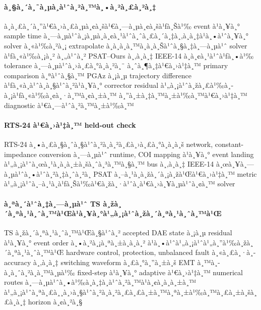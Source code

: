 ﻿\documentclass[12pt,a4paper]{article}
\begin{document}
\paragraph{à¸§à¸´à¸˜à¸µà¸­à¹ˆà¸²à¸™à¸•à¸²à¸£à¸²à¸‡}
à¸à¸£à¸´à¸”à¹€à¸›à¸£à¸µà¸¢à¸šà¹€à¸—à¸µà¸¢à¸šà¹ƒà¸Šà¹‰ event à¹à¸¥à¸° sample time à¸—à¸µà¹ˆà¸¡à¸µà¸­à¸¢à¸¹à¹ˆà¸ˆà¸£à¸´à¸‡à¸‚à¸­à¸‡à¹à¸•à¹ˆà¸¥à¸° solver
à¸«à¹‰à¸²à¸¡ extrapolate à¸­à¸­à¸à¸™à¸­à¸à¸Šà¹ˆà¸§à¸‡à¸—à¸µà¹ˆ solver à¹ƒà¸«à¹‰à¸¡à¸² à¸„à¹ˆà¸² PSAT--Ours à¸‚à¸­à¸‡ IEEE-14
à¸­à¸¢à¸¹à¹ˆà¹ƒà¸•à¹‰ tolerance à¸—à¸µà¹ˆà¸›à¸£à¸°à¸à¸²à¸¨ à¸ˆà¸¶à¸‡à¹€à¸›à¹‡à¸™ primary comparison à¸ªà¹ˆà¸§à¸™ PGAz à¸¡à¸µ
trajectory difference à¹ƒà¸«à¸à¹ˆà¸à¸§à¹ˆà¸²à¹à¸¥à¸° corrector residual à¹„à¸¡à¹ˆà¸žà¸£à¹‰à¸­à¸¡à¹ƒà¸«à¹‰à¸¢à¸·à¸™à¸¢à¸±à¸™
à¸”à¸±à¸‡à¸™à¸±à¹‰à¸™à¹€à¸›à¹‡à¸™ diagnostic à¹€à¸—à¹ˆà¸²à¸™à¸±à¹‰à¸™

\paragraph{RTS-24 à¹€à¸›à¹‡à¸™ held-out check}
RTS-24 à¸•à¸£à¸§à¸ˆà¸§à¹ˆà¸²à¸à¸²à¸£à¸›à¸£à¸°à¸à¸­à¸š network, constant-impedance conversion à¸—à¸µà¹ˆ runtime,
COI mapping à¹à¸¥à¸° event landing à¹„à¸¡à¹ˆà¸œà¸¹à¸à¸à¸±à¸šà¸ˆà¸³à¸™à¸§à¸™ bus à¸‚à¸­à¸‡ IEEE-14 à¸œà¸¥à¸—à¸µà¹ˆà¸•à¹ˆà¸²à¸‡à¸ˆà¸²à¸
PSAT à¸–à¸¹à¸à¸žà¸´à¸¡à¸žà¹Œà¹€à¸›à¹‡à¸™ metric à¹„à¸¡à¹ˆà¸–à¸¹à¸à¹ƒà¸Šà¹‰à¹€à¸žà¸·à¹ˆà¸­à¹€à¸›à¸¥à¸µà¹ˆà¸¢à¸™ solver

\paragraph{à¸ªà¸´à¹ˆà¸‡à¸—à¸µà¹ˆ TS à¸žà¸´à¸ªà¸¹à¸ˆà¸™à¹Œà¹à¸¥à¸°à¹„à¸¡à¹ˆà¸žà¸´à¸ªà¸¹à¸ˆà¸™à¹Œ}
TS à¸žà¸´à¸ªà¸¹à¸ˆà¸™à¹Œà¸§à¹ˆà¸² accepted DAE state à¸¡à¸µ residual à¹à¸¥à¸° event order à¸•à¸²à¸¡à¸ªà¸±à¸à¸à¸²
à¹à¸•à¹ˆà¹„à¸¡à¹ˆà¹„à¸”à¹‰à¸žà¸´à¸ªà¸¹à¸ˆà¸™à¹Œ hardware control, protection, unbalanced fault à¸«à¸£à¸·à¸­
accuracy à¸‚à¸­à¸‡ switching waveform à¸£à¸°à¸”à¸±à¸š EMT à¸™à¸­à¸à¸ˆà¸²à¸à¸™à¸µà¹‰ fixed-step à¹à¸¥à¸° adaptive
à¹€à¸›à¹‡à¸™ numerical routes à¸—à¸µà¹ˆà¸•à¹‰à¸­à¸‡à¸­à¹ˆà¸²à¸™à¹à¸¢à¸à¸à¸±à¸™ à¹„à¸¡à¹ˆà¸ªà¸£à¸¸à¸›à¸§à¹ˆà¸²à¸à¸²à¸£à¸£à¸±à¸™à¸ªà¸±à¹‰à¸™à¸£à¸±à¸šà¸£à¸­à¸‡ horizon à¸¢à¸²à¸§

\begin{center}
\end{center}
\end{document}
